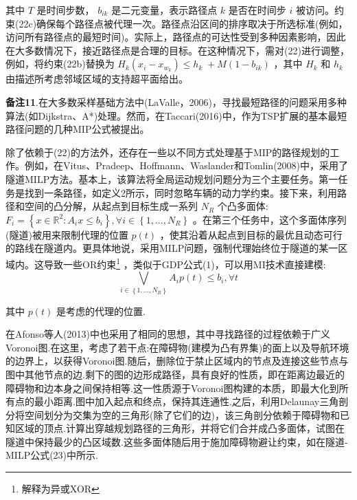 \documentclass[10pt]{article}
\begin{document}
其中 \(T\) 是时间步数， \({b}_{ik}\) 是二元变量，表示路径点 \(k\) 是否在时间步 \(i\) 被访问。约束(22c)确保每个路径点被代理一次。路径点沿区间的排序取决于所选标准(例如，访问所有路径点的最短时间)。实际上，路径点的可达性受到多种因素影响，因此在大多数情况下，接近路径点是合理的目标。在这种情况下，需对(22)进行调整，例如，将约束(22b)替换为 \({H}_{k}\left( {{x}_{i} - {x}_{{w}_{k}}}\right)  \leq  {h}_{k} \; + M\left( {1 - {b}_{ik}}\right)\) ，其中 \({H}_{k}\) 和 \({h}_{k}\) 由描述所考虑邻域区域的支持超平面给出。

\vspace{1 em}
\noindent\textbf{备注11}.在大多数采样基础方法中(LaValle，2006)，寻找最短路径的问题采用多种算法(如Dijkstra、A*)处理。然而，在Taccari(2016)中，作为TSP扩展的基本最短路径问题的几种MIP公式被提出。
\vspace{1 em}

除了依赖于(22)的方法外，还存在一些以不同方式处理基于MIP的路径规划的工作。例如，在Vitus、Pradeep、Hoffmann、Waslander和Tomlin(2008)中，采用了隧道MILP方法。基本上，该算法将全局运动规划问题分为三个主要任务。第一任务是找到一条路径，如定义2所示，同时忽略车辆的动力学约束。接下来，利用路径和空间的凸分解，从起点到目标生成一系列 \({N}_{R}\) 个凸多面体: \({F}_{i} = \left\{  {x \in  {\mathbb{R}}^{2} : {A}_{i}x \leq  {b}_{i}}\right\}  ,\forall i \in  \left\{  {1,\ldots ,{N}_{R}}\right\}\) 。在第三个任务中，这个多面体序列(隧道)被用来限制代理的位置 \(p\left( t\right)\) ，使其沿着从起点到目标的最优且动态可行的路线在隧道内。更具体地说，采用MILP问题，强制代理始终位于隧道的某一区域内。这导致一些OR约束\footnote{解释为异或XOR} ，类似于GDP公式(1)，可以用MI技术直接建模:
\begin{equation}
\mathop{\bigvee }\limits_{{i \in  \left\{  {1,\ldots ,{N}_{R}}\right\}  }}{A}_{i}p\left( t\right)  \leq  {b}_{i},\forall t
\end{equation}

其中 \(p\left( t\right)\) 是考虑的代理的位置.

在Afonso等人(2013)中也采用了相同的思想，其中寻找路径的过程依赖于广义Voronoi图.在这里，考虑了若干点:在障碍物(建模为凸有界集)的面上以及导航环境的边界上，以获得Voronoi图.随后，删除位于禁止区域内的节点及连接这些节点与图中其他节点的边.剩下的图的边形成路径，具有良好的性质，即在距离边最近的障碍物和边本身之间保持相等.这一性质源于Voronoi图构建的本质，即最大化到所有点的最小距离.图中加入起点和终点，保持其连通性.之后，利用Delaunay三角剖分将空间划分为交集为空的三角形(除了它们的边)，该三角剖分依赖于障碍物和已知区域的顶点.计算出穿越规划路径的三角形，并将它们合并成凸多面体，试图在隧道中保持最少的凸区域数.这些多面体随后用于施加障碍物避让约束，如在隧道-MILP公式(23)中所示.
\end{document}
